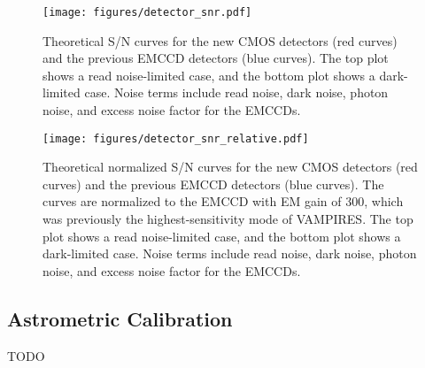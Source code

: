 \begin{figure}
    \centering
    \texttt{[image: figures/detector\_snr.pdf]}
    \caption{Theoretical S/N curves for the new CMOS detectors (red curves) and the previous EMCCD detectors (blue curves). The top plot shows a read noise-limited case, and the bottom plot shows a dark-limited case. Noise terms include read noise, dark noise, photon noise, and excess noise factor for the EMCCDs.\label{fig:detector_snr}}
\end{figure}


\begin{figure}
    \centering
    \texttt{[image: figures/detector\_snr\_relative.pdf]}
    \caption{Theoretical normalized S/N curves for the new CMOS detectors (red curves) and the previous EMCCD detectors (blue curves). The curves are normalized to the EMCCD with EM gain of 300, which was previously the highest-sensitivity mode of VAMPIRES. The top plot shows a read noise-limited case, and the bottom plot shows a dark-limited case. Noise terms include read noise, dark noise, photon noise, and excess noise factor for the EMCCDs.\label{fig:detector_snr_relative}}
\end{figure}


\subsection{Astrometric Calibration}

TODO